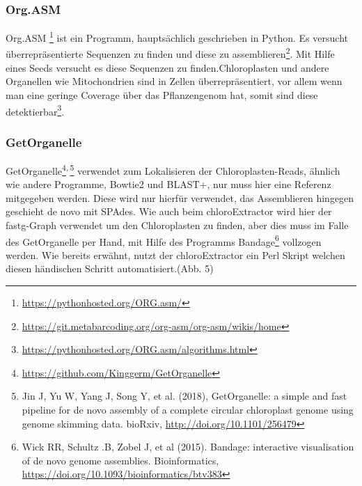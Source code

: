 \documentclass{scrartcl}
\begin{document}
\subsubsection{Org.ASM}
\label{sec-2-5-4}
Org.ASM  \footnote{\url{https://pythonhosted.org/ORG.asm/}} ist ein Programm, hauptsächlich geschrieben in Python. Es versucht überrepräsentierte Sequenzen zu finden und diese zu assemblieren\footnote{\url{https://git.metabarcoding.org/org-asm/org-asm/wikis/home}}. 
Mit Hilfe eines Seeds versucht es diese Sequenzen zu finden.Chloroplasten und andere Organellen wie Mitochondrien sind in Zellen überrepräsentiert, vor allem
wenn man eine geringe Coverage über das Pflanzengenom hat, somit sind diese detektierbar\footnote{\url{https://pythonhosted.org/ORG.asm/algorithms.html}}.
\subsubsection{GetOrganelle}
\label{sec-2-5-5}
GetOrganelle\footnote{\url{https://github.com/Kinggerm/GetOrganelle}}\textsuperscript{,}\,\footnote{Jin J, Yu W, Yang J, Song Y, et al. (2018), GetOrganelle: a simple and fast pipeline for de novo assembly of a complete circular chloroplast genome using genome skimming data. bioRxiv, \url{http://doi.org/10.1101/256479}} verwendet zum Lokalisieren der Chloroplasten-Reads, ähnlich wie andere Programme, Bowtie2 \footnotemark[21]{} und BLAST+, nur muss hier eine Referenz mitgegeben werden. 
Diese wird nur hierfür
verwendet, das Assemblieren hingegen geschieht de novo mit SPAdes. Wie auch beim chloroExtractor wird hier der fastg-Graph verwendet um den Chloroplasten zu finden, aber dies muss im Falle 
des GetOrganelle per Hand, mit Hilfe des Programms Bandage\footnote{Wick RR, Schultz .B, Zobel J, et al (2015). Bandage: interactive visualisation of de novo genome assemblies. Bioinformatics, \url{https://doi.org/10.1093/bioinformatics/btv383}} vollzogen werden. Wie bereits erwähnt, nutzt der chloroExtractor ein Perl Skript welchen diesen händischen Schritt automatisiert.(Abb. 5)
\end{document}
